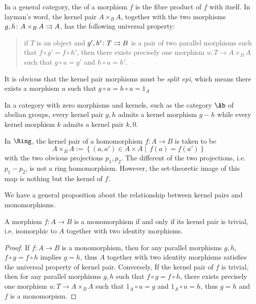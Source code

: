   In a general category, the  of a morphism $f$ is the fibre product of $f$ with itself. In layman's word, the kernel pair $A\times_BA$, together with the two morphisms $g,h\colon A\times_BA\rightrightarrows A$, has the following universal property:
  \begin{quote}
    if $T$ is an object and $g',h'\colon T\rightrightarrows B$ is a pair of two parallel morphisms such that $f\circ g' = f\circ h'$, then there exists precisely one morphism $u\colon T\to A\times_BA$ such that $g\circ u = g'$ and $h\circ u = h'$.
  \end{quote}
  \begin{rem}
    It is obvious that the kernel pair morphisms must be \emph{split epi}, which means there exists a morphism $u$ such that $g\circ u = h\circ u = 1_A$
  \end{rem}

  In a category with zero morphisms and kernels, such as the category $\Ab$ of abelian groups, every kernel pair $g,h$ admits a kernel morphism $g-h$ while every kernel morphism $k$ admits a kernel pair $k,0$.

  In $\Ring$, the kernel pair of a homomorphism $f\colon A\to B$ is taken to be
  \begin{equation*}
    A\times_BA := \left\{(a,a')\in A\times A \middle|\, f(a)=f(a')\right\}
  \end{equation*}
  with the two obvious projections $p_1,p_2$. The different of the two projections, i.e. $p_1-p_2$, is not a ring homomorphism. However, the set-theoretic image of this map is nothing but the kernel of $f$.

  We have a general proposition about the relationship between kernel pairs and monomorphisms.
  \begin{prop}\label{prop:kernel pair and monic}
    A morphism $f\colon A\to B$ is a monomorphism if and only if its kernel pair is trivial, i.e. isomorphic to $A$ together with two identity morphisms.
  \end{prop}
  \begin{proof}
    If $f\colon A\to B$ is a monomorphism, then for any parallel morphisms $g,h$, $f\circ g = f\circ h$ implies $g=h$, thus $A$ together with two identity morphisms satisfies the universal property of kernel pair. Conversely, If the kernel pair of $f$ is trivial, then for any parallel morphisms $g,h$ such that $f\circ g = f\circ h$, there exists precisely one morphism $u\colon T\to A\times_BA$ such that $1_A\circ u = g$ and $1_A\circ u = h$, thus $g=h$ and $f$ is a monomorpism.
  \end{proof}

